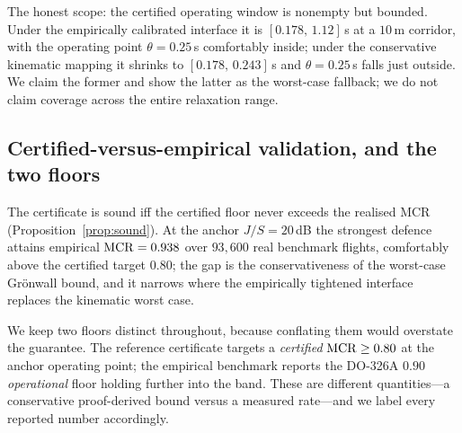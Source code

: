 The honest scope: the certified operating window is nonempty but bounded. Under
the empirically calibrated interface it is $[0.178,\,1.12]$\,s at a $10$\,m
corridor, with the operating point $\theta=0.25$\,s comfortably inside; under
the conservative kinematic mapping it shrinks to $[0.178,\,0.243]$\,s and
$\theta=0.25$\,s falls just outside. We claim the former and show the latter as
the worst-case fallback; we do not claim coverage across the entire relaxation
range.

\subsection{Certified-versus-empirical validation, and the two floors}
The certificate is sound iff the certified floor never exceeds the realised MCR
(Proposition~\ref{prop:sound}). At the anchor $J/S=20$\,dB the strongest defence
attains empirical $\mathrm{MCR}=0.938$ over $93{,}600$ real benchmark flights,
comfortably above the certified target $0.80$; the gap is the conservativeness
of the worst-case Gr\"onwall bound, and it narrows where the empirically
tightened interface replaces the kinematic worst case.

We keep two floors distinct throughout, because conflating them would overstate
the guarantee. The reference certificate targets a \emph{certified}
$\mathrm{MCR}\ge0.80$ at the anchor operating point; the empirical benchmark reports the
DO-326A $0.90$ \emph{operational} floor holding further into the band. These are
different quantities---a conservative proof-derived bound versus a measured
rate---and we label every reported number accordingly.

\begin{table}[t]
\centering
\caption{A representative cross-layer pairing: a detector-evading time-delay
attack still induces measurable navigation staleness. Values from the released
artifact (harness simulation; three-flight $\delta$ calibration; benchmark MCR).}
\label{tab:pairing}
\small
\renewcommand{\arraystretch}{1.15}

\end{table}

